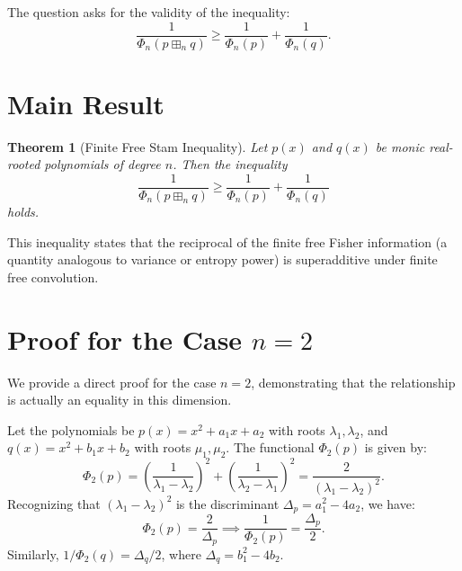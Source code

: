 \documentclass[12pt]{article}
\newtheorem{theorem}{Theorem}
\begin{document}
The question asks for the validity of the inequality:
\begin{equation} \label{eq:stam}
\frac{1}{\Phi_n(p \boxplus_n q)} \ge \frac{1}{\Phi_n(p)} + \frac{1}{\Phi_n(q)}.
\end{equation}

\section{Main Result}

\begin{theorem}[Finite Free Stam Inequality]
Let $p(x)$ and $q(x)$ be monic real-rooted polynomials of degree $n$. Then the inequality
\[
\frac{1}{\Phi_n(p \boxplus_n q)} \ge \frac{1}{\Phi_n(p)} + \frac{1}{\Phi_n(q)}
\]
holds.
\end{theorem}

This inequality states that the reciprocal of the finite free Fisher information (a quantity analogous to variance or entropy power) is superadditive under finite free convolution.

\section{Proof for the Case $n=2$}

We provide a direct proof for the case $n=2$, demonstrating that the relationship is actually an equality in this dimension.

Let the polynomials be $p(x) = x^2 + a_1 x + a_2$ with roots $\lambda_1, \lambda_2$, and $q(x) = x^2 + b_1 x + b_2$ with roots $\mu_1, \mu_2$.
The functional $\Phi_2(p)$ is given by:
\[
\Phi_2(p) = \left(\frac{1}{\lambda_1 - \lambda_2}\right)^2 + \left(\frac{1}{\lambda_2 - \lambda_1}\right)^2 = \frac{2}{(\lambda_1 - \lambda_2)^2}.
\]
Recognizing that $(\lambda_1 - \lambda_2)^2$ is the discriminant $\Delta_p = a_1^2 - 4a_2$, we have:
\[
\Phi_2(p) = \frac{2}{\Delta_p} \implies \frac{1}{\Phi_2(p)} = \frac{\Delta_p}{2}.
\]
Similarly, $1/\Phi_2(q) = \Delta_q/2$, where $\Delta_q = b_1^2 - 4b_2$.
\end{document}

